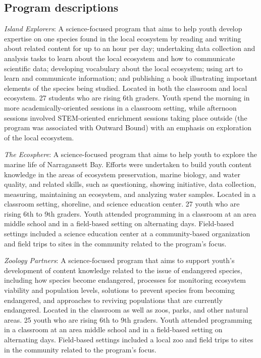 \documentclass[]{msu-thesis}
\theoremstyle{definition}
\theoremstyle{definition}
\theoremstyle{definition}
\theoremstyle{remark}
\begin{document}
\begin{appendices}

\chapter{Program descriptions}

\emph{Island Explorers}: A science-focused program that aims to help
youth develop expertise on one species found in the local ecosystem by
reading and writing about related content for up to an hour per day;
undertaking data collection and analysis tasks to learn about the local
ecosystem and how to communicate scientific data; developing vocabulary
about the local ecosystem; using art to learn and communicate
information; and publishing a book illustrating important elements of
the species being studied. Located in both the classroom and local
ecosystem. 27 students who are rising 6th graders. Youth spend the
morning in more academically-oriented sessions in a classroom setting,
while afternoon sessions involved STEM-oriented enrichment sessions
taking place outside (the program was associated with Outward Bound)
with an emphasis on exploration of the local ecosystem.

\emph{The Ecosphere}: A science-focused program that aims to help youth
to explore the marine life of Narragansett Bay. Efforts were undertaken
to build youth content knowledge in the areas of ecosystem preservation,
marine biology, and water quality, and related skills, such as
questioning, showing initiative, data collection, measuring, maintaining
an ecosystem, and analyzing water samples. Located in a classroom
setting, shoreline, and science education center. 27 youth who are
rising 6th to 9th graders. Youth attended programming in a classroom at
an area middle school and in a field-based setting on alternating days.
Field-based settings included a science education center at a
community-based organization and field trips to sites in the community
related to the program's focus.

\emph{Zoology Partners}: A science-focused program that aims to support
youth's development of content knowledge related to the issue of
endangered species, including how species become endangered, processes
for monitoring ecosystem viability and population levels, solutions to
prevent species from becoming endangered, and approaches to reviving
populations that are currently endangered. Located in the classroom as
well as zoos, parks, and other natural areas. 25 youth who are rising
6th to 9th graders. Youth attended programming in a classroom at an area
middle school and in a field-based setting on alternating days.
Field-based settings included a local zoo and field trips to sites in
the community related to the program's focus.


\end{appendices}
\end{document}
